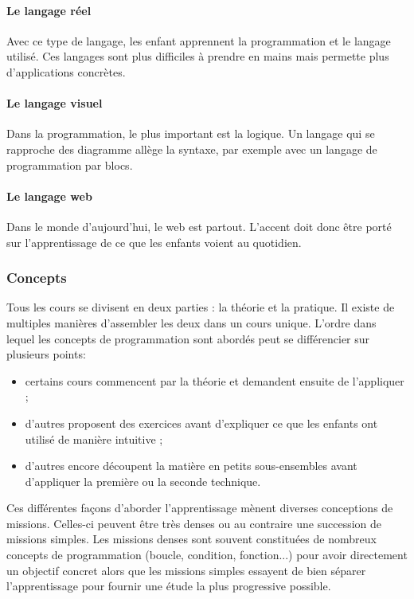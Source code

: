 \paragraph{Le langage réel} Avec ce type de langage, les enfant apprennent la programmation et le langage utilisé. Ces langages sont plus difficiles à prendre en mains mais permette plus d'applications concrètes.
\paragraph{Le langage visuel} Dans la programmation, le plus important est la logique. Un langage qui se rapproche des diagramme allège la syntaxe, par exemple avec un langage de programmation par \glspl{bloc}.
\paragraph{Le langage web} Dans le monde d'aujourd'hui, le web est partout. L'accent doit donc être porté sur l'apprentissage de ce que les enfants voient au quotidien.


\subsubsection{Concepts}
Tous les cours se divisent en deux parties : la théorie et la pratique. Il existe de multiples manières d'assembler les deux dans un cours unique. L'ordre dans lequel les concepts de programmation sont abordés peut se différencier sur plusieurs points:
\begin{itemize}
  \item certains cours commencent par la théorie et demandent ensuite de l'appliquer ;
  \item d'autres proposent des exercices avant d'expliquer ce que les enfants ont utilisé de manière intuitive ;
  \item d'autres encore découpent la matière en petits sous-ensembles avant d'appliquer la première ou la seconde technique.\\
\end{itemize}


Ces différentes façons d'aborder l'apprentissage mènent diverses conceptions de \glspl{mission}. Celles-ci peuvent être très denses ou au contraire une succession de \glspl{mission} simples. Les \glspl{mission} denses sont souvent constituées de nombreux concepts de programmation (boucle, condition, fonction...) pour avoir directement un objectif concret alors que les \glspl{mission} simples essayent de bien séparer l'apprentissage pour fournir une étude la plus progressive possible.\\

